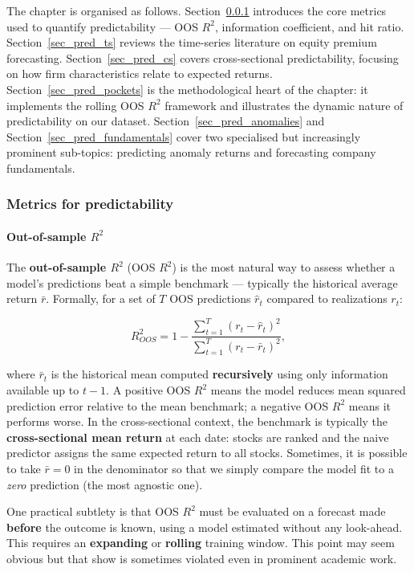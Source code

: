 The chapter is organised as follows. Section~\ref{sec_pred_metrics} introduces the core metrics used to quantify predictability --- OOS $R^2$, information coefficient, and hit ratio. Section~\ref{sec_pred_ts} reviews the time-series literature on equity premium forecasting. Section~\ref{sec_pred_cs} covers cross-sectional predictability, focusing on how firm characteristics relate to expected returns. Section~\ref{sec_pred_pockets} is the methodological heart of the chapter: it implements the rolling OOS $R^2$ framework and illustrates the dynamic nature of predictability on our dataset. Section~\ref{sec_pred_anomalies} and Section~\ref{sec_pred_fundamentals} cover two specialised but increasingly prominent sub-topics: predicting anomaly returns and forecasting company fundamentals.

\subsubsection{Metrics for predictability}\label{sec_pred_metrics}

\paragraph{Out-of-sample $R^2$}

The \textbf{out-of-sample $R^2$} (OOS $R^2$) is the most natural way to assess whether a model's predictions beat a simple benchmark --- typically the historical average return $\bar{r}$. Formally, for a set of $T$ OOS predictions $\hat{r}_t$ compared to realizations $r_t$:

\begin{equation}
\label{eq-oos-r2}
R^2_{OOS} = 1 - \frac{\sum_{t=1}^{T}(r_t - \hat{r}_t)^2}{\sum_{t=1}^{T}(r_t - \bar{r}_t)^2},
\end{equation}

where $\bar{r}_t$ is the historical mean computed \textbf{recursively} using only information available up to $t -1$. A positive OOS $R^2$ means the model reduces mean squared prediction error relative to the mean benchmark; a negative OOS $R^2$ means it performs worse. In the cross-sectional context, the benchmark is typically the \textbf{cross-sectional mean return} at each date: stocks are ranked and the naive predictor assigns the same expected return to all stocks. Sometimes, it is possible to take $\bar{r}=0$ in the denominator so that we simply compare the model fit to a \textit{zero} prediction (the most agnostic one).

One practical subtlety is that OOS $R^2$ must be evaluated on a forecast made \textbf{before} the outcome is known, using a model estimated without any look-ahead. This requires an \textbf{expanding} or \textbf{rolling} training window. This point may seem obvious but that \cite{cakici2025pockets} show is sometimes violated even in prominent academic work.

